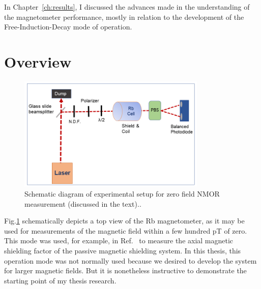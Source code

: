 In Chapter~\ref{ch:results}, I discussed the advances made in the
understanding of the magnetometer performance, mostly in relation to
the development of the Free-Induction-Decay mode of operation.


\section{Overview}

\begin{figure}%
\centering
\includegraphics[width=0.8\textwidth]{figures/experimental_setup_zero_field}
\caption{Schematic diagram of experimental setup for zero field NMOR measurement (discussed in the text).\label{fig:zerofield}.}
\end{figure}
Fig.\ref{fig:zerofield} schematically depicts a top view of the Rb magnetometer, as it may be used for measurements of the magnetic field within a few hundred pT of zero.  This mode was used, for example, in Ref.~\cite{bib:nmor} to measure the axial magnetic shielding factor of
the passive magnetic shielding system.  In this thesis, this operation
mode was not normally used because we desired to develop the system
for larger magnetic fields.  But it is nonetheless instructive to
demonstrate the starting point of my thesis research.

